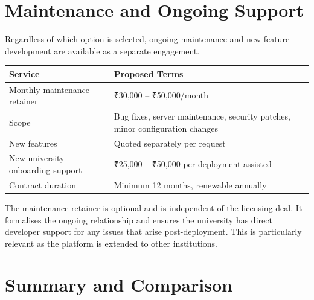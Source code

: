 \documentclass[12pt,a4paper]{article}
\begin{document}
\newpage
\section{Maintenance and Ongoing Support}

Regardless of which option is selected, ongoing maintenance and new feature development are available as a separate engagement.

\begin{tabularx}{\textwidth}{L{5cm} X}
\toprule
{}
\textbf{Service} & \textbf{Proposed Terms} \\
\midrule
Monthly maintenance retainer & ₹30,000 – ₹50,000/month \\
Scope & Bug fixes, server maintenance, security patches, minor configuration changes \\
New features & Quoted separately per request \\
New university onboarding support & ₹25,000 – ₹50,000 per deployment assisted \\
Contract duration & Minimum 12 months, renewable annually \\
\bottomrule
\end{tabularx}

\vspace{0.4cm}

\begin{infobox}
The maintenance retainer is optional and is independent of the licensing deal. It formalises the ongoing relationship and ensures the university has direct developer support for any issues that arise post-deployment. This is particularly relevant as the platform is extended to other institutions.
\end{infobox}

\newpage
\section{Summary and Comparison}
\end{document}
